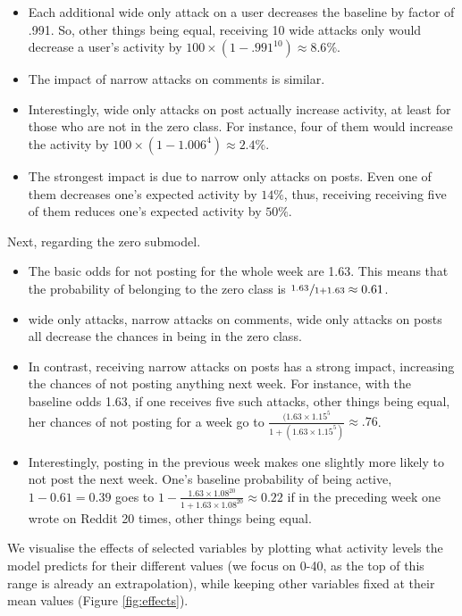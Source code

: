 \documentclass[10pt,]{scrartcl}
\begin{document}
\begin{itemize}
\item Each additional wide only attack on a user decreases the baseline by factor of .991. So, other things being equal, receiving 10 wide attacks only would decrease  a user's activity by $100 \times (1-.991^{10}) \approx 8.6\%$.
\item The impact of narrow attacks on comments is similar.
\item Interestingly, wide only attacks on post actually increase activity, at least for those who are not in the zero class. For instance, four of them would increase the activity by $100\times (1-1.006^4) \approx 2.4\%$.
\item The strongest impact is due to narrow only attacks on posts. Even one of them decreases one's expected activity by $14\%$, thus, receiving  receiving five of them  reduces one's expected activity by $50\%$. 
\end{itemize}

Next, regarding the zero submodel.

\begin{itemize}
\item The basic odds for not posting for the whole week are 1.63. This means that the probability of belonging to the zero class is $\nicefrac{1.63\,}{1+1.63}\approx 0.61$.
\item wide only attacks, narrow attacks on comments, wide only attacks on posts all decrease the chances in being in the zero class.
\item In contrast, receiving narrow attacks on posts has a  strong impact, increasing the chances of not posting anything next week. For instance, with the baseline odds 1.63, if one receives five such attacks, other things being equal, her chances of not posting for a week go to $\frac{(1.63\times 1.15^5 }{1+(1.63\times 1.15^5)}\approx .76$.
\item Interestingly, posting in the previous week makes one slightly more likely to not post the next week. One's baseline probability of being active, $1-0.61 = 0.39$ goes to   $1-\frac{1.63 \times 1.08^20}{1+1.63 \times 1.08^20} \approx 0.22$ if in the preceding week one wrote on \textsf{Reddit} 20 times, other things being equal. 
\end{itemize}

We visualise the effects of selected variables by plotting what activity
levels the model predicts for their different values (we focus on 0-40,
as the top of this range is already an extrapolation), while keeping
other variables fixed at their mean values (Figure \ref{fig:effects}).
\end{document}
